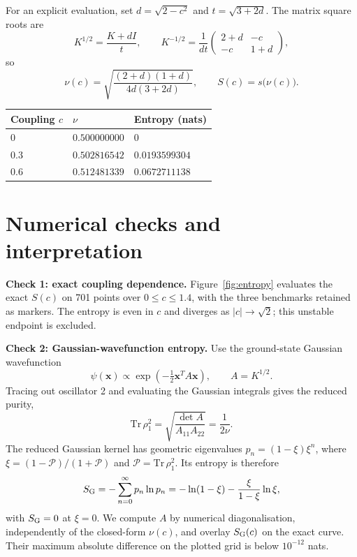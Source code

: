 \documentclass[11pt,a4paper]{article}
\begin{document}
For an explicit evaluation, set $d=\sqrt{2-c^2}$ and $t=\sqrt{3+2d}$. The matrix square roots are
\begin{equation}
K^{1/2}=\frac{K+dI}{t},\qquad K^{-1/2}=\frac1{dt}\begin{pmatrix}2+d&-c\\-c&1+d\end{pmatrix},
\end{equation}
so
\begin{equation}
\nu(c)=\sqrt{\frac{(2+d)(1+d)}{4d(3+2d)}},\qquad S(c)=s\bigl(\nu(c)\bigr).
\end{equation}
\begin{center}\small\begin{tabular}{lll}\toprule Coupling $c$ & $\nu$ & Entropy (nats)\\\midrule
$0$ & $0.500000000$ & $0$\\
$0.3$ & $0.502816542$ & $0.0193599304$\\
$0.6$ & $0.512481339$ & $0.0672711138$\\\bottomrule\end{tabular}\end{center}
\newpage
\begingroup\setlength{\parskip}{4pt}\setlength{\intextsep}{6pt}
\section{Numerical checks and interpretation}
\textbf{Check 1: exact coupling dependence.}
Figure~\ref{fig:entropy} evaluates the exact $S(c)$ on 701 points over $0\leq c\leq1.4$, with the three benchmarks retained as markers. The entropy is even in $c$ and diverges as $|c|\to\sqrt2$; this unstable endpoint is excluded.

\textbf{Check 2: Gaussian-wavefunction entropy.}
Use the ground-state Gaussian wavefunction
\begin{equation}
\psi(\bm x)\propto\exp\!\left(-\tfrac12\bm x^TA\bm x\right),\qquad A=K^{1/2}.
\end{equation}
Tracing out oscillator 2 and evaluating the Gaussian integrals gives the reduced purity,
\begin{equation}
\mathrm{Tr}\,\rho_1^2=\sqrt{\frac{\det A}{A_{11}A_{22}}}=\frac1{2\nu}.
\end{equation}
The reduced Gaussian kernel has geometric eigenvalues $p_n=(1-\xi)\xi^n$, where $\xi=(1-\mathcal P)/(1+\mathcal P)$ and $\mathcal P=\mathrm{Tr}\,\rho_1^2$. Its entropy is therefore
\begin{equation}
S_{\rm G}=-\sum_{n=0}^{\infty}p_n\ln p_n
=-\ln(1-\xi)-\frac{\xi}{1-\xi}\ln\xi,
\end{equation}
with $S_{\rm G}=0$ at $\xi=0$. We compute $A$ by numerical diagonalisation, independently of the closed-form $\nu(c)$, and overlay $S_{\rm G}(c)$ on the exact curve. Their maximum absolute difference on the plotted grid is below $10^{-12}$ nats.
\end{document}
